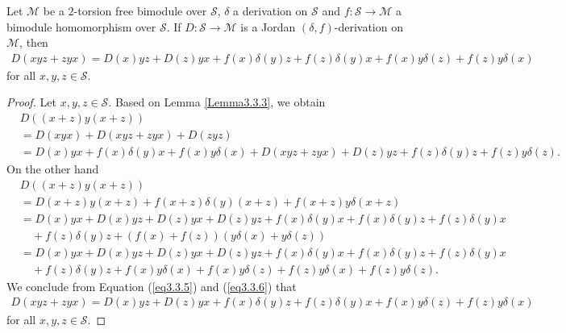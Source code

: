\documentclass{arxiv}
\begin{document}
\begin{lemma}\label{lemma3.3.4}
    Let $\mathcal{M}$ be a $2$-torsion free bimodule over $\mathcal{S}$, $\delta$ a derivation on $\mathcal{S}$ and $f : \mathcal{S} \rightarrow \mathcal{M}$ a bimodule homomorphism over $\mathcal{S}$. If $D:\mathcal{S} \rightarrow \mathcal{M}$ is a Jordan $(\delta,f)$-derivation on $\mathcal{M}$, then
    \begin{align*}
        D(xyz+zyx)= D(x)yz + D(z)yx+f(x)\delta (y) z+ f(z)\delta (y)x + f(x) y \delta (z) + f(z)y \delta (x)
    \end{align*}
    for all $x,y,z \in \mathcal{S}$.
\end{lemma}
\begin{proof}
    Let $x,y,z \in \mathcal{S}$. Based on Lemma \ref{Lemma3.3.3}, we obtain
    \begin{align}
        &D((x+z)y(x+z)) \nonumber \\
        &= D(xyx) + D(xyz+zyx) + D(zyz) \nonumber \\
        &= D(x)yx + f(x)\delta (y)x + f(x) y \delta (x) + D(xyz+zyx)+D(z)yz + f(z)\delta (y) z + f(z) y \delta (z). \label{eq3.3.5}
    \end{align}
    On the other hand
    \begin{align}
        &D((x+z)y(x+z)) \nonumber \\
        &= D(x+z)y(x+z)+f(x+z)\delta(y)(x+z)+f(x+z)y\delta(x+z)\nonumber \\
        &= D(x)yx + D(x)yz + D(z)yx + D(z) yz + f(x) \delta (y) x + f(x) \delta (y) z + f(z) \delta (y)x \nonumber \\
        & \quad + f(z)\delta (y) z + (f(x) + f(z))(y \delta (x) + y \delta (z)) \nonumber \\
        &= D(x)yx + D(x) yz + D(z) yx + D(z)yz + f(x) \delta (y) x + f(x)\delta (y) z + f(z)\delta (y) x \nonumber\\
        &\quad +f(z)\delta(y)z+ f(x) y\delta(x)+ f(x) y \delta (z) + f(z)y \delta (x) + f(z) y \delta (z). \label{eq3.3.6}
    \end{align}
   We conclude from Equation (\ref{eq3.3.5}) and (\ref{eq3.3.6}) that
    \begin{align*}
        D(xyz+zyx)= D(x)yz + D(z)yx+f(x)\delta (y) z+ f(z)\delta (y)x + f(x) y \delta (z) + f(z)y \delta (x)
    \end{align*}
    for all $x,y,z \in \mathcal{S}$.
\end{proof}
\end{document}
